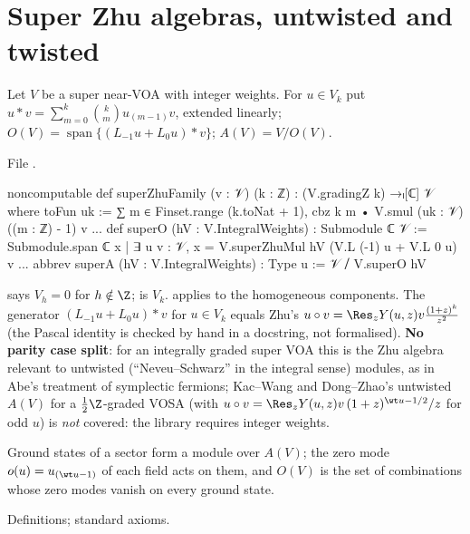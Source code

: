 \section{Super Zhu algebras, untwisted and twisted}\label{l17:sec:zhu}

\begin{definition}\label{l17:def:superzhu}
Let $V$ be a super near-VOA with integer weights. For $u\in V_k$ put
$u\ast v=\sum_{m=0}^{k}\binom km u_{(m-1)}v$, extended linearly; $O(V)=\operatorname{span}\{(L_{-1}u+L_0u)\ast v\}$;
$A(V)=V/O(V)$.
\end{definition}
\noindent File .
\begin{leancode}
noncomputable def superZhuFamily (v : 𝒱) (k : ℤ) : (V.gradingZ k) →ₗ[ℂ] 𝒱 where
  toFun uk := ∑ m ∈ Finset.range (k.toNat + 1), cbz k m • V.smul (uk : 𝒱) ((m : ℤ) - 1) v
...
def superO (hV : V.IntegralWeights) : Submodule ℂ 𝒱 :=
  Submodule.span ℂ {x | ∃ u v : 𝒱, x = V.superZhuMul hV (V.L (-1) u + V.L 0 u) v}
...
abbrev superA (hV : V.IntegralWeights) : Type u := 𝒱 ⧸ V.superO hV
\end{leancode}
\begin{dictionary}
 says $V_h=0$ for $h\notin\Z$;  is $V_k$. 
applies  to the homogeneous components. The generator
$(L_{-1}u+L_0u)\ast v$ for $u\in V_k$ equals Zhu's $u\circ v=\Res_z Y(u,z)v\frac{(1+z)^{k}}{z^2}$ (the
Pascal identity is checked by hand in a docstring, not formalised). \textbf{No parity case split}: for
an integrally graded super VOA this is the Zhu algebra relevant to untwisted (``Neveu--Schwarz'' in the
integral sense) modules, as in Abe's treatment of symplectic fermions; Kac--Wang and Dong--Zhao's
untwisted $A(V)$ for a $\frac12\Z$-graded VOSA (with $u\circ v=\Res_z Y(u,z)v\,(1+z)^{\wt u-1/2}/z$ for odd $u$)
is \emph{not} covered: the library requires integer weights.
\end{dictionary}
\begin{physics}
Ground states of a sector form a module over $A(V)$; the zero mode $o(u)=u_{(\wt u-1)}$ of each field
acts on them, and $O(V)$ is the set of combinations whose zero modes vanish on every ground state.
\end{physics}
\begin{status}
Definitions; standard axioms.
\end{status}

